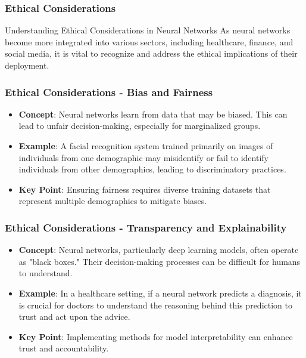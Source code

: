 \documentclass[aspectratio=169]{beamer}
\begin{document}
\begin{frame}[fragile]
    \frametitle{Ethical Considerations}
    \begin{block}{Understanding Ethical Considerations in Neural Networks}
        As neural networks become more integrated into various sectors, including healthcare, finance, and social media, it is vital to recognize and address the ethical implications of their deployment.
    \end{block}
\end{frame}

\begin{frame}[fragile]
    \frametitle{Ethical Considerations - Bias and Fairness}
    \begin{itemize}
        \item \textbf{Concept}: Neural networks learn from data that may be biased. This can lead to unfair decision-making, especially for marginalized groups.
        \item \textbf{Example}: A facial recognition system trained primarily on images of individuals from one demographic may misidentify or fail to identify individuals from other demographics, leading to discriminatory practices.
        \item \textbf{Key Point}: Ensuring fairness requires diverse training datasets that represent multiple demographics to mitigate biases.
    \end{itemize}
\end{frame}

\begin{frame}[fragile]
    \frametitle{Ethical Considerations - Transparency and Explainability}
    \begin{itemize}
        \item \textbf{Concept}: Neural networks, particularly deep learning models, often operate as "black boxes." Their decision-making processes can be difficult for humans to understand.
        \item \textbf{Example}: In a healthcare setting, if a neural network predicts a diagnosis, it is crucial for doctors to understand the reasoning behind this prediction to trust and act upon the advice.
        \item \textbf{Key Point}: Implementing methods for model interpretability can enhance trust and accountability.
    \end{itemize}
\end{frame}
\end{document}
